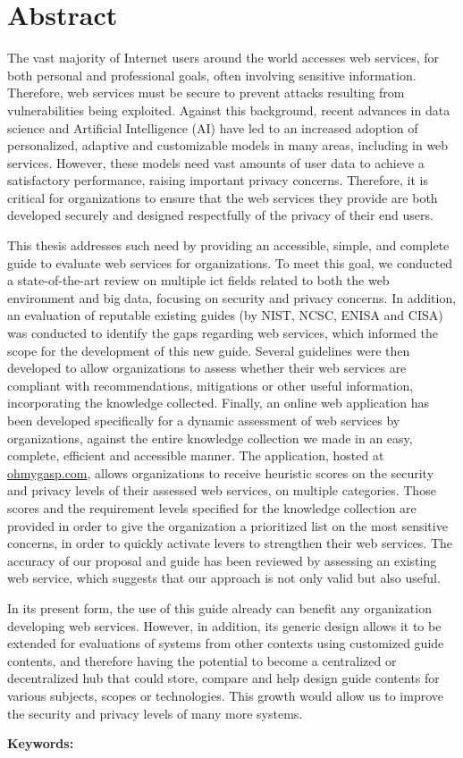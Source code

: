 \chapter*{Abstract}

The vast majority of Internet users around the world accesses web services, for both personal and professional goals, often involving sensitive information. Therefore, web services must be secure to prevent attacks resulting from vulnerabilities being exploited. Against this background, recent advances in data science and Artificial Intelligence (AI) have led to an increased adoption of personalized, adaptive and customizable models in many areas, including in web services. However, these models need vast amounts of user data to achieve a satisfactory performance,  raising important privacy concerns. Therefore, it is critical for organizations to ensure that the web services they provide are both developed securely and designed respectfully of the privacy of their end users.  

This thesis addresses such need by providing an accessible, simple, and complete guide to evaluate web services for organizations. To meet this goal, we conducted a state-of-the-art review on multiple \acrlong*{ict} fields related to both the web environment and big data, focusing on security and privacy concerns. In addition, an evaluation of reputable existing guides (by NIST, NCSC, ENISA and CISA) was conducted to identify the gaps regarding web services, which informed the scope  for the development of this new guide. Several guidelines were then developed to allow organizations to assess whether their web services are compliant with recommendations, mitigations or other useful information, incorporating the  knowledge collected. Finally, an online web application has been developed specifically for a dynamic assessment of web services by organizations, against the entire knowledge collection we made in an easy, complete, efficient and accessible manner. The application, hosted at \href{https://ohmygasp.com}{ohmygasp.com}, allows organizations to receive heuristic scores  on the security and privacy levels of their assessed web services, on multiple categories. Those scores and the requirement levels specified for the knowledge collection are provided in order to give the organization a prioritized list on the most sensitive concerns, in order to quickly activate levers to strengthen their web services. The accuracy of our proposal and guide has been reviewed by assessing an existing web service, which suggests that our approach is not only valid  but also useful.

In its present form, the use of this guide already can benefit any organization developing web services. However, in addition, its generic design allows it to be extended for evaluations of systems from other contexts using customized guide contents, and therefore having the potential to become a centralized or decentralized hub that could store, compare and help design  guide contents for various subjects, scopes or technologies. This growth would allow us to improve the security and privacy levels of many more systems.

\vskip0.5cm
\textbf{Keywords:} 
\Keywords